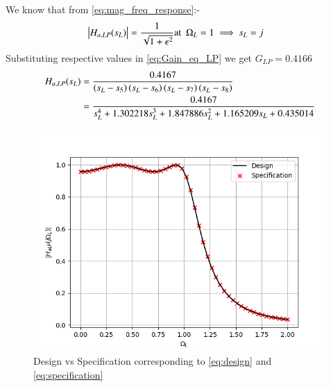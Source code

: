 \documentclass{article}
\begin{document}
\begin{enumerate}
We know that from \eqref{eq:mag_freq_response}:-
\begin{align}
    \left\vert H_{a,LP}(s_L)\right\vert &= \frac{1}{\sqrt{1+\epsilon^2}} \text{at} \hspace{5pt} \Omega_{L}=1 \implies s_{L} = j \label{eq:Gain_eq_LP}
\end{align}
Substituting respective values in \eqref{eq:Gain_eq_LP} we get $G_{LP}=0.4166$
\begin{align}
     H_{a,LP}(s_L) &= \frac{0.4167}{\left(s_L-s_5\right)\left(s_L-s_6\right)\left(s_L-s_7\right)\left(s_L-s_8\right)}\\
     &= \frac{0.4167}{s_L^4 + 1.302218s_L^3 + 1.847886s_L^2 + 1.165209s_L + 0.435014}\label{eq:design}
\end{align}
\begin{figure}[ht]
\centering
\includegraphics[width=1\columnwidth]{figs/spec.png}
\caption{Design vs Specification corresponding to \eqref{eq:design} and \eqref{eq:specification}}
\label{fig:design_vs_specf}
\end{figure}


\end{enumerate}
\end{document}
